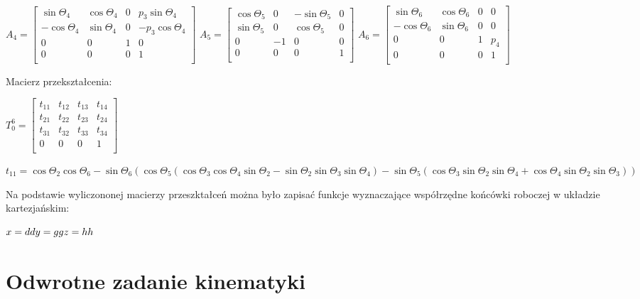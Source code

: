 $A_4 = 
\begin{bmatrix}
\sin \Theta_4 		& \cos \Theta_4	& 0 		& p_3\sin \Theta_4 	\\
-\cos \Theta_4	& \sin \Theta_4 	& 0 		& -p_3\cos \Theta_4 	\\
0 				& 0 				& 1 		& 0 					\\
0 				& 0 				& 0 		& 1 					\\
\end{bmatrix}$
$A_5 = 
\begin{bmatrix}
\cos \Theta_5		& 0 		& -\sin \Theta_5	 & 0 		\\
\sin \Theta_5	 	& 0 		& \cos \Theta_5 	& 0 		\\
0 				& -1 	& 0 				& 0 		\\
0 				& 0 		& 0 				& 1 		\\
\end{bmatrix}$
$A_6 = 
\begin{bmatrix}
\sin \Theta_6	 	& \cos \Theta_6	& 0 		& 0 		\\
-\cos \Theta_6	& \sin \Theta_6	& 0 		& 0 		\\
0 				& 0 				& 1 		& p_4	\\
0 				& 0 				& 0 		& 1 		\\
\end{bmatrix}$

\vspace{5 mm}

Macierz przekształcenia:

$T_0^6=
\begin{bmatrix}
t_{11}		& t_{12}	& t_{13}	& t_{14}	\\
t_{21}		& t_{22}	& t_{23}	& t_{24}	\\
t_{31}		& t_{32}	& t_{33}	& t_{34}	\\
0		& 0		& 0		& 1	\\
\end{bmatrix}$

\vspace{5 mm}

$t_{11} = \cos \Theta_2 \cos \Theta_6 - \sin \Theta_6 (\cos \Theta_5 (\cos \Theta_3 \cos \Theta_4 \sin \Theta_2 - \sin \Theta_2 \sin \Theta_3 \sin \Theta_4) - \sin \Theta_5 (\cos \Theta_3 \sin \Theta_2 \sin \Theta_4 + \cos \Theta_4 \sin \Theta_2 \sin \Theta_3))$

Na podstawie wyliczononej macierzy przeszktałceń można było zapisać funkcje wyznaczające współrzędne końcówki roboczej w układzie kartezjańskim:

\noindent
$x = dd \\
y = gg \\
z = hh \\$

\newpage
\section{Odwrotne zadanie kinematyki}
\label{sec:odwrotneZadanieKinematyki}

